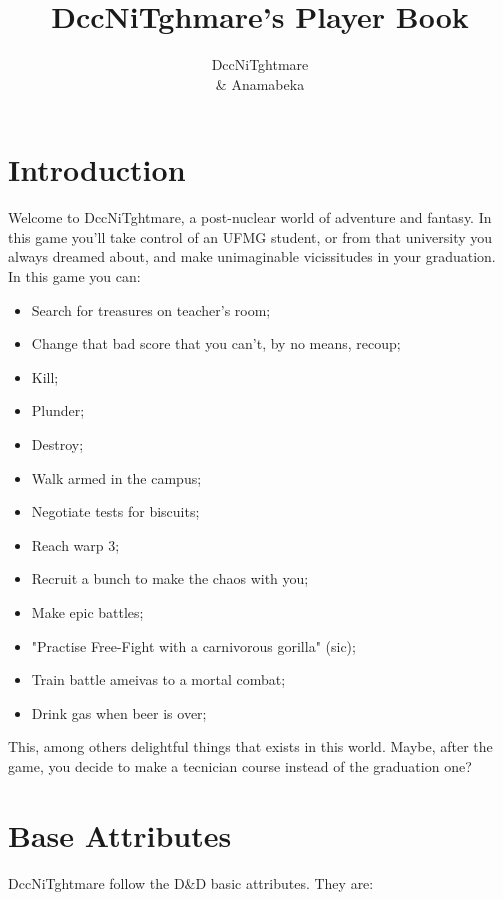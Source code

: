 \documentclass[ letterpaper,12pt]{article}
\begin{document}
\title{\textbf{DccNiTghmare's Player Book}}

\author{
DccNiTghtmare\\ \& Anamabeka
}

\maketitle
{}

\newpage

\tableofcontents

\newpage
\section{Introduction}

Welcome to DccNiTghtmare, a post-nuclear world of adventure and fantasy. In this
game you'll take control of an UFMG student, or from that university you always
dreamed about, and make unimaginable vicissitudes in your graduation. In this
game you can:

\begin{itemize}
\item{Search for treasures on teacher's room;}
\item{Change that bad score that you can't, by no means, recoup;}
\item{Kill;}
\item{Plunder;}
\item{Destroy;}
\item{Walk armed in the campus;}
\item{Negotiate tests for biscuits;}
\item{Reach warp 3;}
\item{Recruit a bunch to make the chaos with you;}
\item{Make epic battles;}
\item{"Practise Free-Fight with a carnivorous gorilla" (sic);}
\item{Train battle ameivas to a mortal combat;}
\item{Drink gas when beer is over;}
\end{itemize}

This, among others delightful things that exists in this world. Maybe, after the game, you decide to make a tecnician course instead of the graduation one?

\section{Base Attributes}
DccNiTghtmare follow the D\&D basic attributes. They are:
\end{document}
